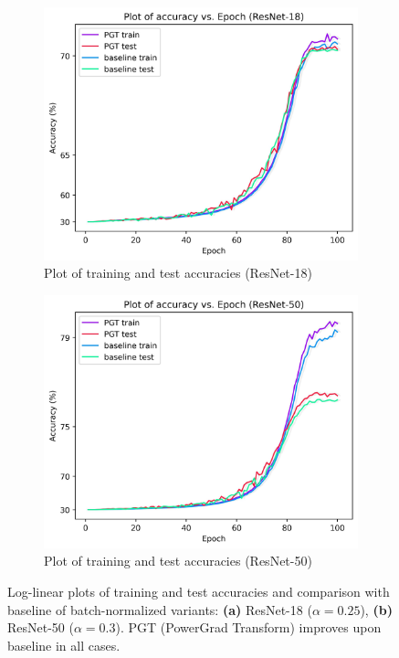\documentclass[times,sort&compress]{elsarticle}
\begin{document}
\begin{figure}[!t]
\centering
\begin{subfigure}{.5\columnwidth}
\centering
\includegraphics[width=0.9\columnwidth]{acc_vs_epoch_r18}
\caption{Plot of training and test accuracies (ResNet-18)}
\end{subfigure}%
\begin{subfigure}{.5\columnwidth}
\centering
\includegraphics[width=0.9\columnwidth]{acc_vs_epoch_r50}
\caption{Plot of training and test accuracies (ResNet-50)}
\end{subfigure}
\caption{ Log-linear plots of training and test accuracies and comparison with baseline
of batch-normalized variants: \textbf{(a)} ResNet-18 ($\alpha=0.25$), \textbf{(b)}
ResNet-50 ($\alpha=0.3$). PGT (PowerGrad Transform) improves upon baseline in all cases.
}
\label{fig:metrics}
\end{figure}
\end{document}
